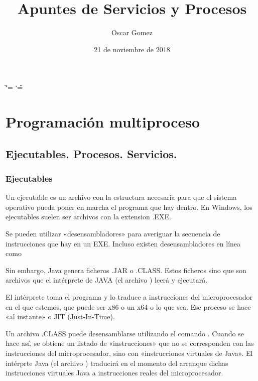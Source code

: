 \documentclass[letterpaper,10pt,spanish]{sphinxmanual}
\title{Apuntes de Servicios y Procesos}
\date{21 de noviembre de 2018}
\author{Oscar Gomez}
\begin{document}
\ifdefined\shorthandoff
  \ifnum\catcode`\=\string=\active\shorthandoff{=}\fi
  \ifnum\catcode`\"=\active{}\fi
\fi

\pagestyle{empty}
\maketitle
\pagestyle{plain}
\sphinxtableofcontents
\pagestyle{normal}
\label{\detokenize{index::doc}}



\chapter{Programación multiproceso}
\label{\detokenize{textos/tema1:programacion-multiproceso}}\label{\detokenize{textos/tema1::doc}}

\section{Ejecutables. Procesos. Servicios.}
\label{\detokenize{textos/tema1:ejecutables-procesos-servicios}}

\subsection{Ejecutables}
\label{\detokenize{textos/tema1:ejecutables}}
Un ejecutable es un archivo con la estructura necesaria para que el sistema operativo pueda poner en marcha el programa que hay dentro. En Windows, los ejecutables suelen ser archivos con la extension .EXE.

Se pueden utilizar «desensambladores» para averiguar la secuencia de instrucciones que hay en un EXE. Incluso existen desensambladores en línea como 

Sin embargo, Java genera ficheros .JAR o .CLASS. Estos ficheros  sino que son archivos que el intérprete de JAVA (el archivo ) leerá y ejecutará.

El intérprete toma el programa y lo traduce a instrucciones del microprocesador en el que estemos, que puede ser x86 o un x64 o lo que sea. Ese proceso se hace «al instante» o JIT (Just-In-Time).

Un archivo .CLASS puede desensamblarse utilizando el comando  . Cuando se hace así, se obtiene un listado de «instrucciones» que no se corresponden con las instrucciones del microprocesador, sino con «instrucciones virtuales de Java». El intérprte Java (el archivo ) traducirá en el momento del arranque dichas instrucciones virtuales Java a instrucciones reales del microprocesador.
\end{document}
